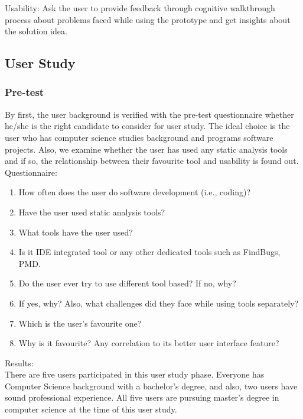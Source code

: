 Usability: Ask the user to provide feedback through cognitive walkthrough process about problems faced while using the prototype and get insights about the solution idea. \\

\subsection{User Study}

\subsubsection{Pre-test}

By first, the user background is verified with the pre-test questionnaire whether he/she is the right candidate to consider for user study. The ideal choice is the user who has computer science studies background and programs software projects. Also, we examine whether the user has used any static analysis tools and if so, the relationship between their favourite tool and usability is found out. \\

Questionnaire: \\

\begin{enumerate}
\item How often does the user do software development (i.e., coding)?
\item Have the user used static analysis tools?
\item What tools have the user used?
\item Is it IDE integrated tool or any other dedicated tools such as FindBugs, PMD.
\item Do the user ever try to use different tool based?  If no, why?
\item If yes, why? Also, what challenges did they face while using tools separately?
\item Which is the user’s favourite one? 
\item Why is it favourite? Any correlation to its better user interface feature?
\end{enumerate}

Results: \\

There are five users participated in this user study phase. Everyone has Computer Science background with a bachelor’s degree, and also, two users have sound professional experience. All five users are pursuing master’s degree in computer science at the time of this user study. \\

